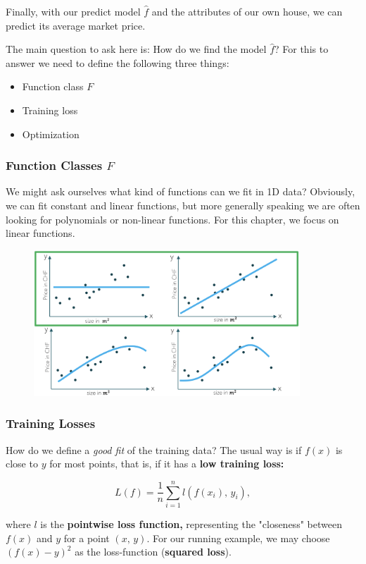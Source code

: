 \documentclass[a4paper]{extarticle}
\begin{document}
Finally, with our predict model \(\hat{f}\) and the attributes of our own house, we can predict its average market price.

 The main question to ask here is: How do we find the model \(\hat{f}\)? For this to answer we need to define the following three things:

\begin{itemize}
	\item Function class \(F\)
	\item Training loss
	\item Optimization
\end{itemize}

\subsubsection{Function Classes \(F\)}

We might ask ourselves what kind of functions can we fit in 1D data? Obviously, we can fit constant and linear functions, but more generally speaking we are often looking for polynomials or non-linear functions. For this chapter, we focus on linear functions.

\begin{figure}[H]
	\includegraphics[width = 10cm]{../images/IntroML_Fig1-4}
	\centering
\end{figure}

\subsubsection{Training Losses}

How do we define a \textit{good fit} of the training data? The usual way is if \(f(x)\) is close to \(y\) for most points, that is, if it has a \textbf{low training loss:}

\[
	L(f) = \frac{1}{n} \sum_{i = 1}^n l(f(x_i), \, y_i),
\]

where \(l\) is the \textbf{pointwise loss function,} representing the "closeness" between \(f(x)\) and \(y\) for a point \((x, \, y)\). For our running example, we may choose \((f(x) - y)^2\) as the loss-function (\textbf{squared loss}).
\end{document}
